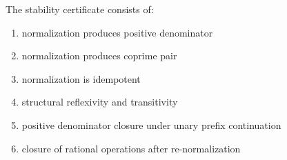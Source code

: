 The stability certificate consists of:
\begin{enumerate}
  \item normalization produces positive denominator
  \item normalization produces coprime pair
  \item normalization is idempotent
  \item structural reflexivity and transitivity
  \item positive denominator closure under unary prefix continuation
  \item closure of rational operations after re-normalization
\end{enumerate}
